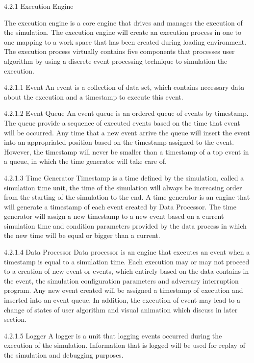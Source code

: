 4.2.1 Execution Engine

The execution engine is a core engine that drives and manages the execution of the simulation. The execution engine will create an execution process in one to one mapping to a work space that has been created during loading environment. The execution process virtually contains five components that processes user algorithm by using a discrete event processing technique to simulation the execution.




4.2.1.1 Event
An event is a collection of data set, which contains necessary data about the execution and a timestamp to execute this event.

4.2.1.2 Event Queue
An event queue is an ordered queue of events by timestamp. The queue provide a sequence of executed events based on the time that event will be occurred. Any time that a new event arrive the queue will insert the event into an appropriated position based on the timestamp assigned to the event. However, the timestamp will never be smaller than a timestamp of a top event in a queue, in which the time generator will take care of.

4.2.1.3 Time Generator
Timestamp is a time defined by the simulation, called a simulation time unit, the time of the simulation will always be increasing order from the starting of the simulation to the end. A time generator is an engine that will generate a timestamp of each event created by Data Processor. The time generator will assign a new timestamp to a new event based on a current simulation time and condition parameters provided by the data process in which the new time will be equal or bigger than a current.

4.2.1.4 Data Processor
Data processor is an engine that executes an event when a timestamp is equal to a simulation time. Each execution may or may not proceed to a creation of new event or events, which entirely based on the data contains in the event, the simulation configuration parameters and adversary interruption program. Any new event created will be assigned a timestamp of execution and inserted into an event queue. In addition, the execution of event may lead to a change of states of user algorithm and visual animation which discuss in later section.

4.2.1.5 Logger
A logger is a unit that logging events occurred during the execution of the simulation. Information that is logged will be used for replay of the simulation and debugging purposes.


